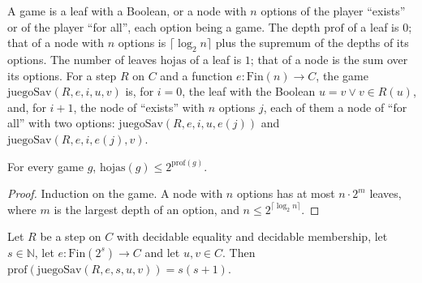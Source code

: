 \begin{definition}
  \label{def:machines-game}
  \leanok
  A game is a leaf with a Boolean, or a node with $n$ options of the player ``exists'' or of the player
  ``for all'', each option being a game. The depth $\mathrm{prof}$ of a leaf is $0$; that of a node with $n$
  options is $\lceil \log_2 n \rceil$ plus the supremum of the depths of its options. The number of leaves
  $\mathrm{hojas}$ of a leaf is $1$; that of a node is the sum over its options. For a step $R$ on $C$ and a
  function $e : \mathrm{Fin}(n) \to C$, the game $\mathrm{juegoSav}(R, e, i, u, v)$ is, for $i = 0$, the leaf with
  the Boolean $u = v \lor v \in R(u)$, and, for $i + 1$, the node of ``exists'' with $n$ options $j$, each of
  them a node of ``for all'' with two options: $\mathrm{juegoSav}(R, e, i, u, e(j))$ and
  $\mathrm{juegoSav}(R, e, i, e(j), v)$.
  \own{}
  \infrastructure{}
\end{definition}

\begin{theorem}
  \label{thm:machines-leaves}
  \leanok
  For every game $g$, $\mathrm{hojas}(g) \le 2^{\mathrm{prof}(g)}$.
\end{theorem}

\begin{proof}
  \leanok
  Induction on the game. A node with $n$ options has at most $n \cdot 2^{m}$ leaves, where $m$ is the largest
  depth of an option, and $n \le 2^{\lceil \log_2 n \rceil}$.
\end{proof}

\begin{theorem}
  \label{thm:machines-savitch-game}
  \leanok
  Let $R$ be a step on $C$ with decidable equality and decidable membership, let $s \in \mathbb{N}$, let
  $e : \mathrm{Fin}(2^s) \to C$ and let $u, v \in C$. Then
  $\mathrm{prof}(\mathrm{juegoSav}(R, e, s, u, v)) = s (s + 1)$.
\end{theorem}

